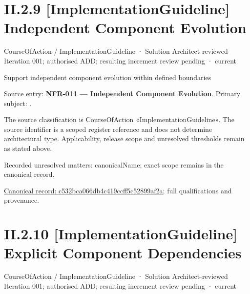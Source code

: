 \section*{II.2.9 [ImplementationGuideline] Independent Component Evolution}
\label{navigation:II.2.9}

\label{element:c532bca066db4c419ccff5c52899af2a}
{\small CourseOfAction / ImplementationGuideline · Solution Architect-reviewed Iteration 001; authorised ADD; resulting increment review pending · current}\par

Support independent component evolution within defined boundaries



Source entry: \textbf{NFR-011 — Independent Component Evolution}. Primary subject: \texttt{}.



The source classification is CourseOfAction «ImplementationGuideline». The source identifier is a scoped register reference and does not determine architectural type. Applicability, release scope and unresolved thresholds remain as stated above.


{\small Recorded unresolved matters: canonicalName; exact scope remains in the canonical record.}\par
{\footnotesize \href{../../../../../../../continuum/strategy/course-of-action/implementation-guideline/c532bca066db4c419ccff5c52899af2a.md}{Canonical record: c532bca066db4c419ccff5c52899af2a}; full qualifications and provenance.}\par
\section*{II.2.10 [ImplementationGuideline] Explicit Component Dependencies}
\label{navigation:II.2.10}

\label{element:2c21d1a175fb4c1486f6a91830838cde}
{\small CourseOfAction / ImplementationGuideline · Solution Architect-reviewed Iteration 001; authorised ADD; resulting increment review pending · current}\par

